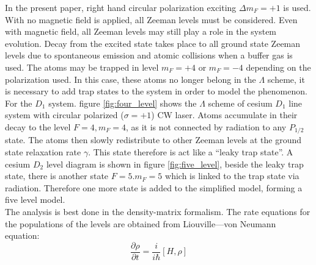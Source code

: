 \documentclass[11pt,a4paper]{article}
\begin{document}
In the present paper, right hand circular polarization exciting $\Delta m_F = +1$ is used. With no magnetic field is applied, all Zeeman levels must be considered. Even with magnetic field, all Zeeman levels may still play a role in the system evolution. Decay from the excited state takes place to all ground state Zeeman levels due to spontaneous emission and atomic collisions when a buffer gas is used. The atoms may be trapped in level $m_F = +4$ or $m_F = -4$ depending on the polarization used. In this case, these atoms no longer belong in the $\Lambda$ scheme, it is necessary to add trap states to the system in order to model the phenomenon\cite{Vanier1998}. For the $D_1$ system. figure \ref{fig:four_level} shows the $\Lambda$ scheme of cesium $D_1$ line system with circular polarized ($\sigma = +1$) CW laser. Atoms accumulate in their decay to the level $F=4,m_F=4$, as it is not connected by radiation to any $P_{1/2}$ state. The atoms then slowly redistribute to other Zeeman levels at the ground state relaxation rate $\gamma$. This state therefore is act like a ``leaky trap state''. A cesium $D_2$ level diagram is shown in figure \ref{fig:five_level}, beside the leaky trap state, there is another state $F=5.m_F=5$ which is linked to the trap state via radiation. Therefore one more state is added to the simplified model, forming a five level model.\\

The analysis is best done in the density-matrix formalism. The rate equations for the populations of the levels are obtained from Liouville—von Neumann equation:
\begin{equation}
  \label{eq:lvn}
  \frac{\partial \rho}{\partial t} = \frac{i}{i\hbar} \left[ H,\rho \right]
\end{equation}
\end{document}
